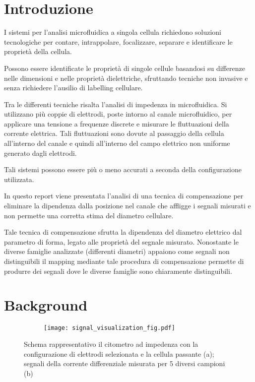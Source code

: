 \section{Introduzione}

I sistemi per l'analisi microfluidica a singola cellula richiedono soluzioni tecnologiche per contare, intrappolare, focalizzare, separare e identificare le proprietà della cellula. 

Possono essere identificate le proprietà di singole cellule basandosi su differenze nelle dimensioni e nelle proprietà dielettriche, sfruttando tecniche non invasive e senza richiedere l'ausilio di labelling cellulare.

Tra le differenti tecniche risalta l'analisi di impedenza in microfluidica. Si utilizzano più coppie di elettrodi, poste intorno al canale microfluidico, per applicare una tensione a frequenze discrete e misurare le fluttuazioni della corrente elettrica. Tali fluttuazioni sono dovute al passaggio della cellula all'interno del canale e quindi all'interno del campo elettrico non uniforme generato dagli elettrodi. 

Tali sistemi possono essere più o meno accurati a seconda della configurazione utilizzata.

In questo report viene presentata l'analisi di una tecnica di compensazione per eliminare la dipendenza dalla posizione nel canale che affligge i segnali misurati e non permette una corretta stima del diametro cellulare.

Tale tecnica di compensazione sfrutta la dipendenza del diametro elettrico dal parametro di forma, legato alle proprietà del segnale misurato. Nonostante le diverse famiglie analizzate (differenti diametri) appaiono come segnali non distinguibili il mapping mediante tale procedura di compensazione permette di produrre dei segnali dove le diverse famiglie sono chiaramente distinguibili.

\section{Background}

\begin{figure*}
	\begin{subfigure}{0.6\linewidth}
		\centering
		\footnotesize{ \def\svgwidth{\linewidth}
	    }
		\caption{}
	\end{subfigure}\hfill
	\begin{subfigure}{0.4\linewidth}
	\centering
	\texttt{[image: signal\_visualization\_fig.pdf]}
	\caption{}
\end{subfigure}
\caption{Schema rappresentativo il citometro ad impedenza con la configurazione di elettrodi selezionata e la cellula passante (a); segnali della corrente differenziale misurata per 5 diversi campioni (b)}
\label{fig:generale}
\end{figure*}

